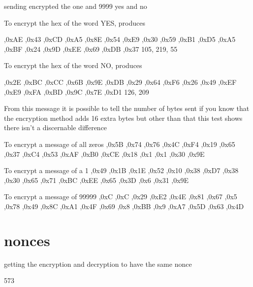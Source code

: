 sending encrypted the one and 9999
yes and no

To encrypt the hex of the word YES, produces 

,0xAE ,0x43 ,0xCD ,0xA5 ,0x8E ,0x54 ,0xE9 ,0x30
 ,0x59 ,0xB1 ,0xD5 ,0xA5 ,0xBF ,0x24 ,0x9D ,0xEE
 ,0x69 ,0xDB ,0x37
 105, 219, 55

To encrypt the hex of the word NO, produces 

 ,0x2E ,0xBC ,0xCC ,0x6B ,0x9E ,0xDB ,0x29 ,0x64
 ,0xF6 ,0x26 ,0x49 ,0xEF ,0xE9 ,0xFA ,0xBD ,0x9C
 ,0x7E ,0xD1
126, 209

From this message it is possible to tell the number of bytes sent if you know that the encryption method adds 16 extra bytes but other than that this test shows there isn't a discernable difference


To encrypt a message of all zeros
,0x5B ,0x74 ,0x76 ,0x4C ,0xF4 ,0x19 ,0x65 ,0x37
 ,0xC4 ,0x53 ,0xAF ,0xB0 ,0xCE ,0x18 ,0x1 ,0x1
 ,0x30 ,0x9E

To encrypt a message of a 1
,0x49 ,0x1B ,0x1E ,0x52 ,0x10 ,0x38 ,0xD7 ,0x38
 ,0x30 ,0x65 ,0x71 ,0xBC ,0xEE ,0x65 ,0x3D ,0x6
 ,0x31 ,0x9E

To encrypt a message of 99999
,0xC ,0xC ,0x29 ,0xE2 ,0x4E ,0x81 ,0x67 ,0x5
 ,0x78 ,0x49 ,0x8C ,0xA1 ,0x4F ,0x69 ,0x8 ,0xBB
 ,0x9 ,0xA7 ,0x5D ,0x63 ,0x4D

\section{nonces}

getting the encryption and decryption to have the same nonce


573